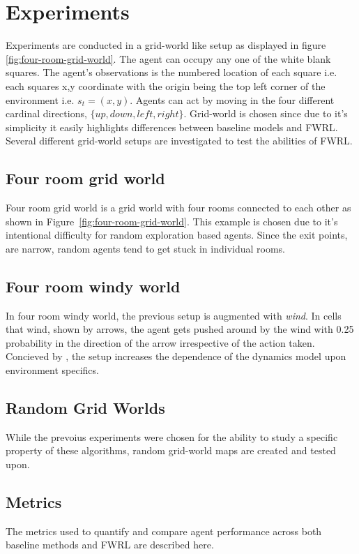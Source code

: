 \section{Experiments}

Experiments are conducted in a grid-world like setup as displayed in
figure \ref{fig:four-room-grid-world}. The agent can occupy any one of
the white blank squares. The agent's observations is the numbered
location of each square i.e. each squares x,y coordinate with the origin
being the top left corner of the environment i.e. $s_t = (x, y)$. Agents
can act by moving in the four different cardinal directions, $\{up,
down, left, right\}$. Grid-world is chosen since due to it's simplicity
it easily highlights differences between baseline models and FWRL.
Several different grid-world setups are investigated to test the
abilities of FWRL.


\subsection{Four room grid world}
Four room grid world is a grid world with four rooms connected to each
other as shown in Figure~\ref{fig:four-room-grid-world}. This example is
chosen due to it's intentional difficulty for random exploration based
agents. Since the exit points, are narrow, random agents tend to get
stuck in individual rooms. 

\subsection{Four room windy world}

In four room windy world, the previous setup is augmented with
\emph{wind}. In cells that  wind, shown by arrows, the agent gets pushed
around by the wind with 0.25 probability in the direction of the arrow
irrespective of the action taken. Concieved by \cite{}, the setup
increases the dependence of the dynamics model upon environment
specifics.

\subsection{Random Grid Worlds}
While the prevoius experiments were chosen for the ability to study a
specific property of these algorithms, random grid-world maps are
created and tested upon.

\subsection{Metrics}
The metrics used to quantify and compare agent performance across
both baseline methods and FWRL are described here.

